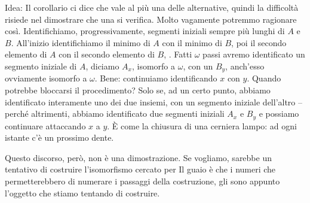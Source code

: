 {\drkgrn Idea: Il corollario ci dice che vale al pi\`u una delle alternative, quindi la difficolt\`a risiede nel dimostrare che una si verifica. Molto vagamente potremmo ragionare cos\`i.
Identifichiamo, progressivamente, segmenti iniziali sempre pi\`u lunghi di
$A$ e $B$. All'inizio identifichiamo il minimo di $A$ con il minimo di
$B$, poi il secondo elemento di $A$ con il secondo elemento di $B$, \etc. Fatti $\omega$
passi avremo identificato un segmento iniziale di $A$, diciamo $A_x$, isomorfo a $\omega$, con un $B_y$, anch'esso ovviamente isomorfo a $\omega$. Bene: continuiamo identificando $x$ con $y$. Quando potrebbe bloccarsi il procedimento?
Solo se, ad un certo punto, abbiamo identificato interamente uno dei due
insiemi, con un segmento iniziale dell'altro -- perch\'e altrimenti, abbiamo identificato due segmenti iniziali $A_x$ e $B_y$ e possiamo continuare attaccando $x$ a $y$. \`E 
come la chiusura di una cerniera lampo: ad ogni istante c'\`e un prossimo dente.

{\drkred Questo discorso, per\`o, non \`e una dimostrazione.} Se vogliamo,
sarebbe un tentativo di costruire l'isomorfismo cercato per
 Il guaio \`e che i numeri che permetterebbero di numerare i passaggi della costruzione,
gli  sono appunto l'oggetto che stiamo tentando di costruire.}

